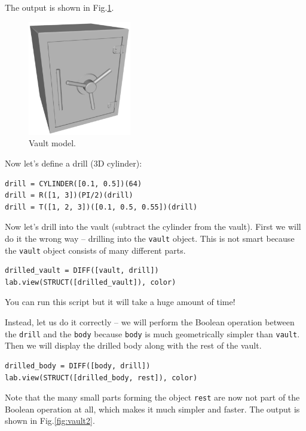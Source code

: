 \documentclass{article}
\begin{document}
\noindent
The output is shown in Fig.\ref{fig:vault}.

\begin{figure}[!ht]
\begin{center}
\includegraphics[width=0.4\textwidth]{img/vault.png}
\end{center}
\vspace{-2mm}
\caption{Vault model.}
\label{fig:vault}
\end{figure}
\noindent
Now let's define a drill (3D cylinder): 
\begin{verbatim}
drill = CYLINDER([0.1, 0.5])(64)
drill = R([1, 3])(PI/2)(drill)
drill = T([1, 2, 3])([0.1, 0.5, 0.55])(drill)
\end{verbatim}
Now let's drill into the vault (subtract the cylinder from the vault). First we will do it 
the wrong way -- drilling into the {\tt vault} object. This is not smart because 
the {\tt vault} object consists of many different parts.

\begin{verbatim}
drilled_vault = DIFF([vault, drill])
lab.view(STRUCT([drilled_vault]), color)
\end{verbatim}
You can run this script but it will take a huge amount of time!

Instead, let us do it correctly -- we will perform the Boolean operation between the {\tt drill}
and the {\tt body} because {\tt body} is much geometrically simpler than {\tt vault}. Then
we will display the drilled body along with the rest of the vault. 

\begin{verbatim}
drilled_body = DIFF([body, drill])
lab.view(STRUCT([drilled_body, rest]), color)
\end{verbatim}
Note that the many small parts 
forming the object {\tt rest} are now not part of the Boolean 
operation at all, which makes it much simpler and faster.
The output is shown in Fig.\ref{fig:vault2}.
\end{document}
